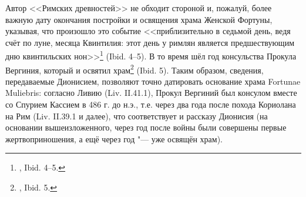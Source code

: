 Автор <<Римских древностей>> не обходит стороной и, пожалуй, более важную дату окончания постройки и освящения храма Женской Фортуны, указывая, что произошло это событие <<приблизительно в седьмой день, ведя счёт по луне, месяца Квинтилия: этот день у римлян является предшествующим дню квинтильских нон>>\footnote{, Ibid. 4--5.} (Ibid. 4--5). В то время шёл год консульства Прокула Вергиния, который и освятил храм\footnote{, Ibid. 5.} (Ibid. 5). Таким образом, сведения, передаваемые Дионисием, позволяют точно датировать основание храма Fortunae Muliebris: согласно Ливию (Liv. II.41.1), Прокул Вергиний был консулом вместе со Спурием Кассием в 486 г. до н.э., т.е. через два года после похода Кориолана на Рим (Liv. II.39.1 и далее), что соответствует и рассказу Дионисия (на основании вышеизложенного, через год после войны были совершены первые жертвоприношения, а ещё через год "--- уже освящён храм).





